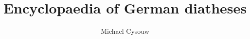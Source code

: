 \author{Michael Cysouw}
\title{Encyclopaedia of German diatheses}
\subtitle{}
\renewcommand{\lsSeries}{ogl}
\renewcommand{\lsSeriesNumber}{}

